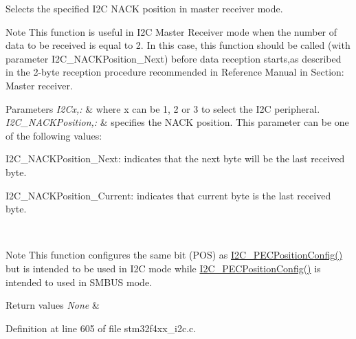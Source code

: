 Selects the specified I2\-C N\-A\-C\-K position in master receiver mode. 

\begin{DoxyNote}{Note}
This function is useful in I2\-C Master Receiver mode when the number of data to be received is equal to 2. In this case, this function should be called (with parameter I2\-C\-\_\-\-N\-A\-C\-K\-Position\-\_\-\-Next) before data reception starts,as described in the 2-\/byte reception procedure recommended in Reference Manual in Section\-: Master receiver. 
\end{DoxyNote}

\begin{DoxyParams}{Parameters}
{\em I2\-Cx,\-:} & where x can be 1, 2 or 3 to select the I2\-C peripheral. \\
\hline
{\em I2\-C\-\_\-\-N\-A\-C\-K\-Position,\-:} & specifies the N\-A\-C\-K position. This parameter can be one of the following values\-: \begin{DoxyItemize}
\item I2\-C\-\_\-\-N\-A\-C\-K\-Position\-\_\-\-Next\-: indicates that the next byte will be the last received byte. \item I2\-C\-\_\-\-N\-A\-C\-K\-Position\-\_\-\-Current\-: indicates that current byte is the last received byte.\end{DoxyItemize}
\\
\hline
\end{DoxyParams}
\begin{DoxyNote}{Note}
This function configures the same bit (P\-O\-S) as \hyperlink{group___i2_c___exported___functions_ga5d0f939bdd45542502827bf408f24161}{I2\-C\-\_\-\-P\-E\-C\-Position\-Config()} but is intended to be used in I2\-C mode while \hyperlink{group___i2_c___exported___functions_ga5d0f939bdd45542502827bf408f24161}{I2\-C\-\_\-\-P\-E\-C\-Position\-Config()} is intended to used in S\-M\-B\-U\-S mode.
\end{DoxyNote}

\begin{DoxyRetVals}{Return values}
{\em None} & \\
\hline
\end{DoxyRetVals}


Definition at line 605 of file stm32f4xx\-\_\-i2c.\-c.


